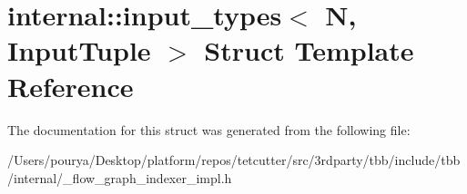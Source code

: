 \hypertarget{structinternal_1_1input__types}{}\section{internal\+:\+:input\+\_\+types$<$ N, Input\+Tuple $>$ Struct Template Reference}
\label{structinternal_1_1input__types}


The documentation for this struct was generated from the following file\+:\begin{DoxyCompactItemize}
\item 
/\+Users/pourya/\+Desktop/platform/repos/tetcutter/src/3rdparty/tbb/include/tbb/internal/\+\_\+flow\+\_\+graph\+\_\+indexer\+\_\+impl.\+h\end{DoxyCompactItemize}

